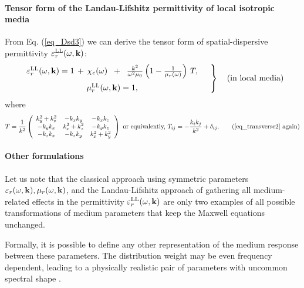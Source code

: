 \paragraph{Tensor form of the Landau-Lifshitz permittivity of local isotropic media}%
From Eq. (\ref{eq_Dsd3}) we can derive the tensor form of spatial-dispersive permittivity $\varepsilon_r^\text{LL}(\omega,{\mathbf{k}})$:
\begin{equation} 
\left.  \begin{array}{c}
\epsLL(\omega,\kk) = 1 \,+\, \chi_e(\omega) \;\;+\;\; \frac{k^2}{\omega^2 \mu_0}\left(1 - \frac{1}{\murl(\omega)}\right) \, T, \medskip \\
\muLL(\omega,\kk) = 1, 
\end{array} \quad \right\} \quad \text{(in local media)}
\label{eq_epsmusd3} \end{equation} 
where 
\begin{equation} T = \frac{1}{k^2} 
\left(\begin{array}{ccc} 
	k_y^2+k_z^2		& -k_x k_y		& -k_x k_z \\ 
	-k_y k_x		& k_x^2+k_z^2	& -k_y k_z \\ 
	-k_z k_x		& -k_z k_y		& k_x^2+k_y^2
	\end{array} \right) 
\text{ or equivalently, }
T_{ij} = - \frac{k_i k_j}{k^2} + \delta_{ij} . \tag{\ref{eq_transverse2} \again} \end{equation}

\paragraph{Other formulations}%
Let us note that the classical approach using symmetric parameters $\varepsilon_r(\omega,{\mathbf{k}}),\mu_r(\omega,{\mathbf{k}})$, and the Landau-Lifshitz approach of gathering all medium-related effects in the permittivity $\varepsilon_r^\text{LL}(\omega,{\mathbf{k}})$ are only two examples of all possible transformations of medium parameters that keep the Maxwell equations unchanged. 

Formally, it is possible to define any other representation of the medium response between these parameters. The distribution weight may be even frequency dependent, leading to a physically realistic pair of parameters with uncommon spectral shape \cite{skaar2014diamagnetism}.



